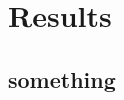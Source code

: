 
\chapter{Results}
\label{chapter5}

\ifpdf
    \graphicspath{{Chapter5/Figs/Raster/}{Chapter5/Figs/PDF/}{Chapter5/Figs/}}
\else
    \graphicspath{{Chapter5/Figs/Vector/}{Chapter5/Figs/}}
\fi

\section{something}
\label{section5.1}